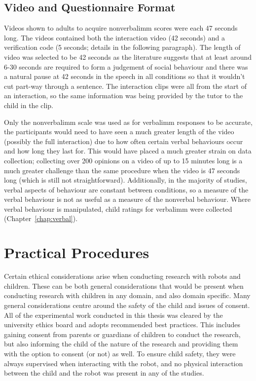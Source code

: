 \subsection{Video and Questionnaire Format}
Videos shown to adults to acquire \gls{nonverbalimm} scores were each 47 seconds long. The videos contained both the interaction video (42 seconds) and a verification code (5 seconds; details in the following paragraph). The length of video was selected to be 42 seconds as the literature suggests that at least around 6-30 seconds are required to form a judgement of social behaviour \citep{ambady1993half} and there was a natural pause at 42 seconds in the speech in all conditions so that it wouldn't cut part-way through a sentence. The interaction clips were all from the start of an interaction, so the same information was being provided by the tutor to the child in the clip.

Only the \gls{nonverbalimm} scale was used as for \gls{verbalimm} responses to be accurate, the participants would need to have seen a much greater length of the video (possibly the full interaction) due to how often certain verbal behaviours occur and how long they last for. This would have placed a much greater strain on data collection; collecting over 200 opinions on a video of up to 15 minutes long is a much greater challenge than the same procedure when the video is 47 seconds long (which is still not straightforward). Additionally, in the majority of studies, verbal aspects of behaviour are constant between conditions, so a measure of the verbal behaviour is not as useful as a measure of the nonverbal behaviour. Where verbal behaviour is manipulated, child ratings for \gls{verbalimm} were collected (Chapter~\ref{chap:verbal}).

\section{Practical Procedures}\label{sec:method-ethics}
Certain ethical considerations arise when conducting research with robots and children. These can be both general considerations that would be present when conducting research with children in any domain, and also domain specific. Many general considerations centre around the safety of the child and issues of consent. All of the experimental work conducted in this thesis was cleared by the university ethics board and adopts recommended best practices. This includes gaining consent from parents or guardians of children to conduct the research, but also informing the child of the nature of the research and providing them with the option to consent (or not) as well. To ensure child safety, they were always supervised when interacting with the robot, and no physical interaction between the child and the robot was present in any of the studies.

